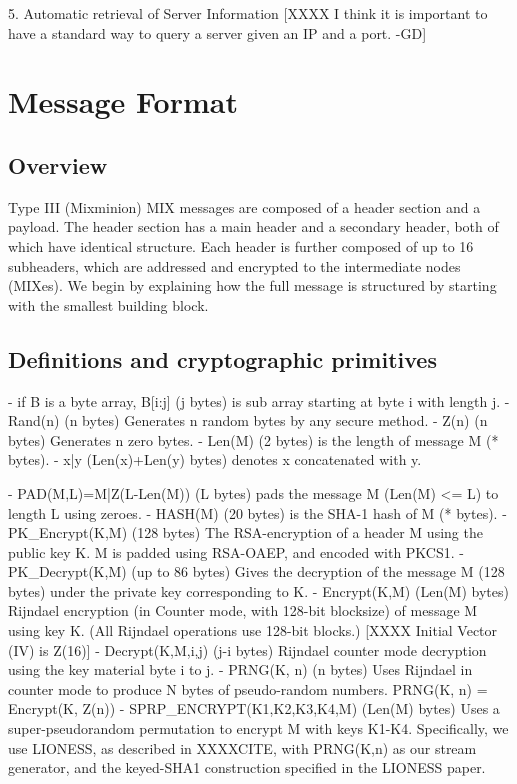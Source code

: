 5. Automatic retrieval of Server Information
[XXXX I think it is important to have a standard way to query a server given 
      an IP and a port. -GD]

\section{Message Format}

\subsection{Overview}

Type III (Mixminion) MIX messages are composed of a header section and a
payload.  The header section has a main header and a
secondary header, both of which have identical structure.  Each
header is further composed of up to 16 subheaders, which are
addressed and encrypted to the intermediate nodes (MIXes).  We
begin by explaining how the full message is structured by starting
with the smallest building block.

\subsection{Definitions and cryptographic primitives}

- if B is a byte array, B[i:j] (j bytes) is sub array starting at 
  byte i with length j.
- Rand(n) (n bytes) Generates n random bytes by any secure method.
- Z(n) (n bytes) Generates n zero bytes.
- Len(M) (2 bytes) is the length of message M (* bytes).
- x|y (Len(x)+Len(y) bytes) denotes x concatenated with y.

- PAD(M,L)=M|Z(L-Len(M)) (L bytes) pads the message M (Len(M) <= L)
  to length L using zeroes.
- HASH(M) (20 bytes) is the SHA-1 hash of M (* bytes).
- PK_Encrypt(K,M) (128 bytes) The RSA-encryption of a header M 
  using the public key K.  M is padded using RSA-OAEP, and encoded
  with PKCS1.
- PK_Decrypt(K,M) (up to 86 bytes) Gives the decryption of the
  message M (128 bytes) under the private key corresponding to K.
- Encrypt(K,M) (Len(M) bytes) Rijndael encryption (in Counter mode,
  with 128-bit blocksize) of message M using key K.  (All Rijndael
  operations use 128-bit blocks.)
  [XXXX Initial Vector (IV) is Z(16)]
- Decrypt(K,M,i,j) (j-i bytes) Rijndael counter mode decryption 
  using the key material byte i to j.
- PRNG(K, n) (n bytes) Uses Rijndael in counter mode to produce N
  bytes of pseudo-random numbers.
  PRNG(K, n) = Encrypt(K, Z(n))
- SPRP_ENCRYPT(K1,K2,K3,K4,M) (Len(M) bytes) Uses a super-pseudorandom
  permutation to encrypt M with keys K1-K4.  Specifically, we use LIONESS,
  as described in XXXXCITE, with PRNG(K,n) as our stream generator,
  and the keyed-SHA1 construction specified in the LIONESS paper.

